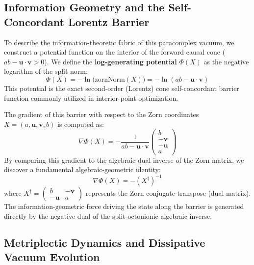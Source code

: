\documentclass[11pt,a4paper]{article}
\begin{document}
\subsection{Information Geometry and the Self-Concordant Lorentz Barrier}

To describe the information-theoretic fabric of this paracomplex vacuum, we construct a potential function on the interior of the forward causal cone ($ab - \mathbf{u} \cdot \mathbf{v} > 0$). We define the \textbf{log-generating potential} $\Phi(X)$ as the negative logarithm of the split norm:
\begin{equation}
\Phi(X) = -\ln\big(\text{zornNorm}(X)\big) = -\ln(ab - \mathbf{u} \cdot \mathbf{v})
\end{equation}
This potential is the exact second-order (Lorentz) cone self-concordant barrier function commonly utilized in interior-point optimization. 

The gradient of this barrier with respect to the Zorn coordinates $X = (a, \mathbf{u}, \mathbf{v}, b)$ is computed as:
\begin{equation}
\nabla \Phi(X) = -\frac{1}{ab - \mathbf{u} \cdot \mathbf{v}} \begin{pmatrix} b \\ -\mathbf{v} \\ -\mathbf{u} \\ a \end{pmatrix}
\end{equation}
By comparing this gradient to the algebraic dual inverse of the Zorn matrix, we discover a fundamental algebraic-geometric identity:
\begin{equation}
\nabla \Phi(X) = -(X^\dagger)^{-1}
\end{equation}
where $X^\dagger = \begin{pmatrix} b & -\mathbf{v} \\ -\mathbf{u} & a \end{pmatrix}$ represents the Zorn conjugate-transpose (dual matrix). The information-geometric force driving the state along the barrier is generated directly by the negative dual of the split-octonionic algebraic inverse.

\subsection{Metriplectic Dynamics and Dissipative Vacuum Evolution}
\end{document}

